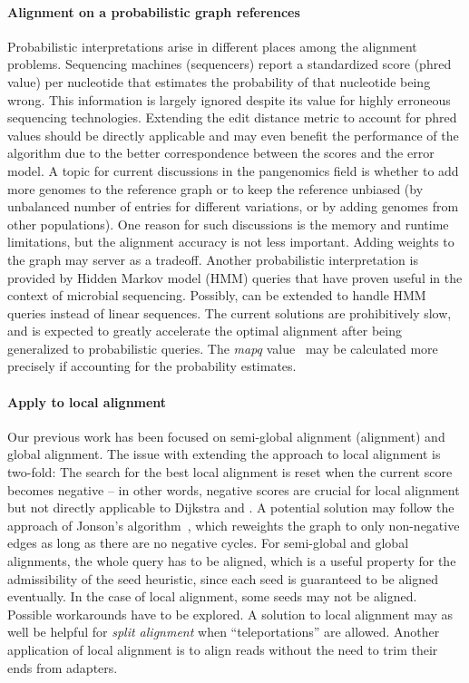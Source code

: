 \paragraph{Alignment on a probabilistic graph references}
Probabilistic interpretations arise in different places among the alignment
problems. Sequencing machines (sequencers) report a standardized score (phred
value) per nucleotide that estimates the probability of that nucleotide being
wrong. This information is largely ignored despite its value for highly
erroneous sequencing technologies. Extending the edit distance metric to account
for phred values should be directly applicable and may even benefit the
performance of the \A algorithm due to the better correspondence between the
scores and the error model. A topic for current discussions in the pangenomics
field is whether to add more genomes to the reference graph or to keep the
reference unbiased (by unbalanced number of entries for different variations, or
by adding genomes from other populations). One reason for such discussions is
the memory and runtime limitations, but the alignment accuracy is not less
important. Adding weights to the graph may server as a tradeoff. Another
probabilistic interpretation is provided by Hidden Markov model (HMM) queries
that have proven useful in the context of microbial sequencing. Possibly, \A can
be extended to handle HMM queries instead of linear sequences. The current
solutions are prohibitively slow, and \astarix is expected to greatly accelerate
the optimal alignment after being generalized to probabilistic queries. The
\textit{mapq} value~\citep{li2008mapping} may be calculated more precisely if
accounting for the probability estimates.

\paragraph{Apply \A to local alignment}
Our previous work has been focused on semi-global alignment (alignment) and
global alignment. The issue with extending the \A approach to local alignment is
two-fold: The search for the best local alignment is reset when the current
score becomes negative -- in other words, negative scores are crucial for local
alignment but not directly applicable to Dijkstra and \A. A potential solution
may follow the approach of Jonson's algorithm~\citep{johnson1977efficient},
which reweights the graph to only non-negative edges as long as there are no
negative cycles. For semi-global and global alignments, the whole query has to
be aligned, which is a useful property for the admissibility of the seed
heuristic, since each seed is guaranteed to be aligned eventually. In the case
of local alignment, some seeds may not be aligned. Possible workarounds have to
be explored. A solution to local alignment may as well be helpful for
\textit{split alignment} when ``teleportations'' are allowed. Another
application of local alignment is to align reads without the need to trim their
ends from adapters.

